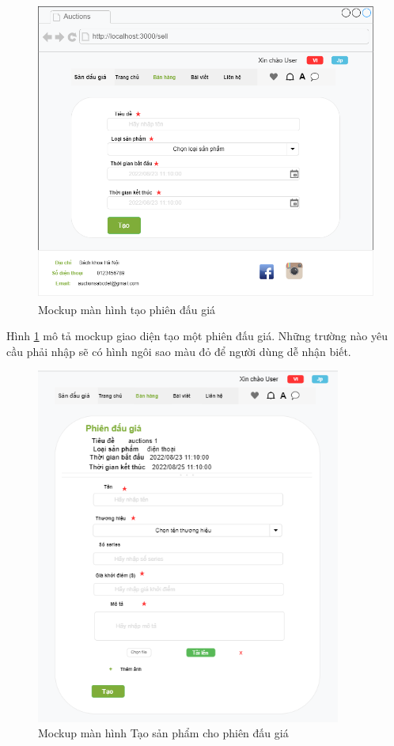 \documentclass{article}
\begin{document}
\begin{figure}[H]
    \centering
    \includegraphics[width=11.43cm,height=9.87cm]{images/createauction.png}
    \caption{Mockup màn hình tạo phiên đấu giá}
    \label{hinh49}
\end{figure}
Hình \ref{hinh49} mô tả mockup giao diện tạo một phiên đấu giá. Những trường nào yêu cầu phải nhập sẽ có hình ngôi sao màu đỏ để người dùng dễ nhận biết.
\begin{figure}[H]
    \centering
    \includegraphics[width=10.04cm,height=11.76cm]{images/itemcreate.png}
    \caption{Mockup màn hình Tạo sản phẩm cho phiên đấu giá}
    \label{hinh410}
\end{figure}
\end{document}
